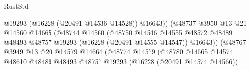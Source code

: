 \begin{lexlean}{RustStd}
\begin{coremodule}
                                                            @19293
                                                            (@16228 (@20491 @14536 @14528))
                                                            @16643))
                                                        (@48737
                                                          @3950
                                                          @13
                                                          @21
                                                          @14560
                                                          @14665
                                                          (@48744
                                                            @14560
                                                            (@48750
                                                              @14546
                                                              @14555
                                                              @48572
                                                              @48489
                                                              @48493
                                                              @48757
                                                              @19293
                                                              (@16228 (@20491 @14555 @14547))
                                                              @16643))
                                                          (@48767
                                                            @3949
                                                            @13
                                                            @20
                                                            @14579
                                                            @14664
                                                            (@48774
                                                              @14579
                                                              (@48780
                                                                @14565
                                                                @14574
                                                                @48610
                                                                @48489
                                                                @48493
                                                                @48757
                                                                @19293
                                                                (@16228 (@20491 @14574 @14566))

\end{coremodule}
\end{lexlean}
